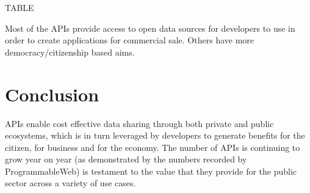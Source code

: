 TABLE

Most of the APIs provide access to open data sources for developers to use in order to create applications
for commercial sale. Others have more democracy/citizenship based aims.

\section{Conclusion}

APIs enable cost effective data sharing through both private and public ecosystems, which is in turn
leveraged by developers to generate benefits for the citizen, for business and for the economy. The number
of APIs is continuing to grow year on year (as demonstrated by the numbers recorded by
ProgrammableWeb) is testament to the value that they provide for the public sector across a variety of use
cases.
